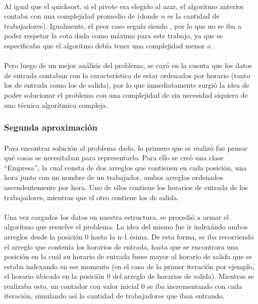\paragraph{}
Al igual que el quicksort, si el pivote era elegido al azar, el algoritmo anterior contaba con una complejidad promedio de  (donde $n$ es la cantidad de trabajadores).  Igualmente, el peor caso segu\'ia siendo , por lo que no se iba a poder respetar la cota dada como m\'axima para este trabajo, ya que se especificaba que el algoritmo deb\'ia tener una complejidad menor a .

\paragraph{}
Pero luego de un mejor an\'alisis del problema, se cay\'o en la cuenta que los datos de entrada contaban con la caracter\'istica de estar ordenados por horario (tanto los de entrada como los de salida), por lo que inmediatamente surgi\'o la idea de poder solucionar el problema con una complejidad de  sin necesidad siquiera de una técnica algorítmica compleja.


\subsubsection{Segunda aproximación}
\paragraph{}
Para encontrar soluci\'on al problema dado, lo primero que se realiz\'o fue pensar qu\'e cosas se necesitaban para representarlo. Para ello se cre\'o una clase ``Empresa'', la cual consta de dos arreglos que contienen en cada posici\'on, una hora junto con un nombre de un trabajador, ambos arreglos ordenados ascendentemente por hora. Uno de ellos contiene los horarios de entrada de los trabajadores, mientras que el otro contiene los de salida. 

\paragraph{}
Una vez cargados los datos en nuestra estructura, se procedi\'o a armar el algoritmo que resuelve el problema. La idea del mismo fue ir index\'ando ambos arreglos desde la posici\'on 0 hasta la n-1 \'esima. De esta forma, se iba recorriendo el arreglo que conten\'ia los horarios de entrada, hasta que se encontrara una posici\'on en la cu\'al su horario de entrada fuese mayor al horario de salida que se estaba indexando en ese momento (en el caso de la primer iteraci\'on por ejemplo, el horario ubicado en la posici\'on 0 del arreglo de horarios de salida). Mientras se realizaba esto, un contador con valor inicial 0 se iba incrementando con cada iteraci\'on, simulando as\'i la cantidad de trabajadores que iban entrando.

